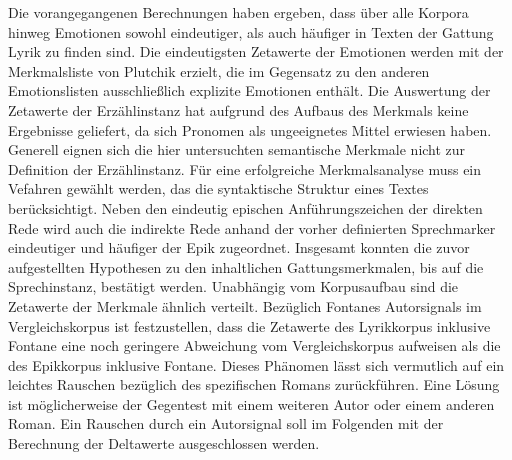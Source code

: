 \documentclass[a4paper,10p]{article}
\begin{document}
Die vorangegangenen Berechnungen haben ergeben, dass über alle Korpora hinweg Emotionen sowohl eindeutiger, als auch häufiger in Texten der Gattung Lyrik zu finden sind. Die eindeutigsten Zetawerte der Emotionen werden mit der Merkmalsliste von Plutchik erzielt, die im Gegensatz zu den anderen Emotionslisten ausschließlich explizite Emotionen enthält. Die Auswertung der Zetawerte der Erzählinstanz hat aufgrund des Aufbaus des Merkmals keine Ergebnisse geliefert, da sich Pronomen als ungeeignetes Mittel erwiesen haben. Generell eignen sich die hier untersuchten semantische Merkmale nicht zur Definition der Erzählinstanz. Für eine erfolgreiche Merkmalsanalyse muss ein Vefahren gewählt werden, das die syntaktische Struktur eines Textes berücksichtigt. Neben den eindeutig epischen Anführungszeichen der direkten Rede wird auch die indirekte Rede anhand der vorher definierten Sprechmarker eindeutiger und häufiger der Epik zugeordnet. Insgesamt konnten die zuvor aufgestellten Hypothesen zu den inhaltlichen Gattungsmerkmalen, bis auf die Sprechinstanz, bestätigt werden. Unabhängig vom Korpusaufbau sind die Zetawerte der Merkmale ähnlich verteilt. Bezüglich Fontanes Autorsignals im Vergleichskorpus ist festzustellen, dass die Zetawerte des Lyrikkorpus inklusive Fontane eine noch geringere Abweichung vom Vergleichskorpus aufweisen als die des Epikkorpus inklusive Fontane. Dieses Phänomen lässt sich vermutlich auf ein leichtes Rauschen bezüglich des spezifischen Romans zurückführen. Eine Lösung ist möglicherweise der Gegentest mit einem weiteren Autor oder einem anderen Roman. Ein Rauschen durch ein Autorsignal soll im Folgenden mit der Berechnung der Deltawerte ausgeschlossen werden.
\end{document}
